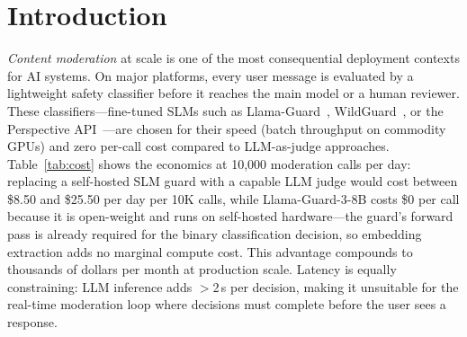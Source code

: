 \documentclass[letterpaper]{article}
\begin{document}
\begin{abstract}
A controlled A/B study ($n{=}4$ software developers with minimal ML background, counterbalanced Latin square) confirms
the practical value on ToxicChat/Llama-Guard: prototype explanations reduce diagnostic
latency by \textbf{47\%} and improve root-cause accuracy from 44\% to 56\%. In 92\%
of misclassification cases the explanation autonomously contradicts the guard's decision
without requiring developer interpretation; the 2nd/3rd prototype achieves a 100\%
rescue rate across the covered taxonomy. These numbers are specific to our experimental
setup; the approach generalises to any Llama-Guard-family model and dataset because it
depends on prototype polarity, not dataset-calibrated thresholds.
We further formalise four threshold-free Linear Temporal Logic (LTL) properties
from prototype polarity that serve a dual purpose: at runtime, $\phi_\text{incoherent}$
(100\% precision, 33\% coverage on ToxicChat) routes structurally uncertain cases to
LLM-based thorough review or human review, while $\phi_\text{polarised}$ handles the
remaining 67\% automatically---scaling content moderation by reserving expensive review
for cases that genuinely need it. Coverage will vary across deployments; minimal calibration of prototype labels
may be needed for new guard models, but the polarity-based routing logic itself
requires no threshold recalibration. In the offline diagnostic phase,
$\phi_\text{FP}$ and $\phi_\text{FN}$ help developers identify systematic guard
failures and guide fine-tuning.
\end{abstract}

\section{Introduction}

\textit{Content moderation} at scale is one of the most consequential deployment contexts for
AI systems. On major platforms, every user message is evaluated by a lightweight safety
classifier before it reaches the main model or a human reviewer. These classifiers---fine-tuned
SLMs such as Llama-Guard~\cite{inan2023llamaguard}, WildGuard~\cite{wildguard2024}, or
the Perspective API~\cite{lees2022perspective}---are chosen for their speed (batch throughput on commodity GPUs)
and zero per-call cost compared to LLM-as-judge approaches. Table~\ref{tab:cost} shows
the economics at 10,000 moderation calls per day: replacing a self-hosted SLM guard
with a capable LLM judge would cost between \$8.50 and \$25.50 per day per 10K calls,
while Llama-Guard-3-8B costs \$0 per call because it is open-weight and runs on
self-hosted hardware---the guard's forward pass is already required for the binary
classification decision, so embedding extraction adds no marginal compute cost.
This advantage compounds to thousands of dollars per month at production scale.
Latency is equally constraining: LLM inference adds $>$2\,s per decision, making it
unsuitable for the real-time moderation loop where decisions must complete before
the user sees a response.
\end{document}
